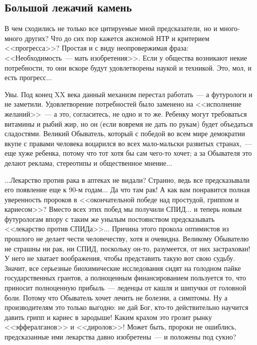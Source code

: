 \documentclass{scrbook}
\newcommand{\flqq}{<<}
\newcommand{\frqq}{>>}
\newcommand{\mdash}{~--- }
\newcommand{\commamdash}{~--- } %
\newcommand{\essaysection}[1]{\subsection*{#1}\nopagebreak}
\begin{document}
\essaysection{Большой лежачий камень}

В чем сходились не только все цитируемые мной предсказатели, но и много-много других? Что до сих пор кажется аксиомой НТР и критерием {\flqq}прогресса{\frqq}? Простая и с виду неопровержимая фраза: {\flqq}Необходимость{\mdash}мать изобретения{\frqq}. Если у общества возникают некие потребности, то они вскоре будут удовлетворены наукой и техникой. Это, мол, и есть прогресс...

Увы. Под конец XX века данный механизм перестал работать{\mdash}а футурологи и не заметили. Удовлетворение потребностей было заменено на {\flqq}исполнение желаний{\frqq}{\mdash}а это, согласитесь, не одно и то же. Ребенку могут требоваться витамины и рыбий жир, но он (если вовремя не дать по рукам) будет объедаться сладостями. Великий Обыватель, который с победой во всем мире демократии вкупе с правами человека воцарился во всех мало-мальски развитых странах,{\commamdash}еще хуже ребенка, потому что тот хотя бы сам чего-то хочет; а за Обывателя это делают реклама, стереотипы и общественное мнение...

...Лекарство против рака в аптеках не видали? Странно, ведь все предсказывали его появление еще к 90-м годам... Да что там рак! А как вам понравится полная уверенность пророков в {\flqq}окончательной победе над простудой, гриппом и кариесом{\frqq}? Вместо всех этих побед мы получили СПИД... и теперь новым футурологам впору с таким же унылым постоянством предсказывать {\flqq}лекарство против СПИДа{\frqq}... Причина этого прокола оптимистов из прошлого не делает чести человечеству, хотя и очевидна. Великому Обывателю не страшны ни рак, ни СПИД, поскольку он-то, разумеется, от них застрахован! У него не хватает воображения, чтобы представить такую вот свою судьбу. Значит, все серьезные биохимические исследования сидят на голодном пайке государственных грантов, а полноценным финансированием пользуется то, что приносит полноценную прибыль{\mdash}леденцы от кашля и шипучки от головной боли. Потому что Обыватель хочет лечить не болезни, а симптомы. Ну а производителям это только выгодно: не дай Бог, кто-то действительно научится давить грипп и кариес в зародыше! Каким крахом это грозит рынку {\flqq}эффералганов{\frqq} и {\flqq}диролов{\frqq}! Может быть, пророки не ошиблись, предсказанные ими лекарства давно изобретены{\mdash}и положены под сукно?
\end{document}
